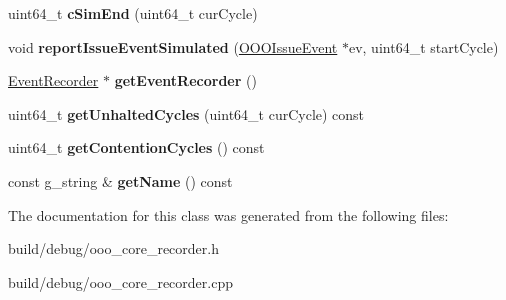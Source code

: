 \begin{DoxyCompactItemize}
\item 
\hypertarget{classOOOCoreRecorder_a156522803029ba35178bc25dc0549b9b}{uint64\-\_\-t {\bfseries c\-Sim\-End} (uint64\-\_\-t cur\-Cycle)}\label{classOOOCoreRecorder_a156522803029ba35178bc25dc0549b9b}

\item 
\hypertarget{classOOOCoreRecorder_abdc5c2a36c87aa1502d40fd3f1ad853c}{void {\bfseries report\-Issue\-Event\-Simulated} (\hyperlink{classOOOIssueEvent}{O\-O\-O\-Issue\-Event} $\ast$ev, uint64\-\_\-t start\-Cycle)}\label{classOOOCoreRecorder_abdc5c2a36c87aa1502d40fd3f1ad853c}

\item 
\hypertarget{classOOOCoreRecorder_ad3da06397db838c7a84706565bef39a0}{\hyperlink{classEventRecorder}{Event\-Recorder} $\ast$ {\bfseries get\-Event\-Recorder} ()}\label{classOOOCoreRecorder_ad3da06397db838c7a84706565bef39a0}

\item 
\hypertarget{classOOOCoreRecorder_a41f9c7df626593718d934bc34b020c47}{uint64\-\_\-t {\bfseries get\-Unhalted\-Cycles} (uint64\-\_\-t cur\-Cycle) const }\label{classOOOCoreRecorder_a41f9c7df626593718d934bc34b020c47}

\item 
\hypertarget{classOOOCoreRecorder_ad209b06e7cd2a6179f48d285467fee21}{uint64\-\_\-t {\bfseries get\-Contention\-Cycles} () const }\label{classOOOCoreRecorder_ad209b06e7cd2a6179f48d285467fee21}

\item 
\hypertarget{classOOOCoreRecorder_a63d175b3d61168f486a00f47b70a2d58}{const g\-\_\-string \& {\bfseries get\-Name} () const }\label{classOOOCoreRecorder_a63d175b3d61168f486a00f47b70a2d58}

\end{DoxyCompactItemize}


The documentation for this class was generated from the following files\-:\begin{DoxyCompactItemize}
\item 
build/debug/ooo\-\_\-core\-\_\-recorder.\-h\item 
build/debug/ooo\-\_\-core\-\_\-recorder.\-cpp\end{DoxyCompactItemize}
